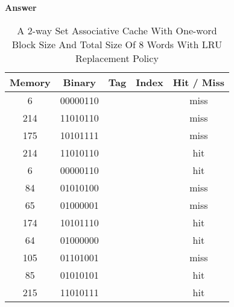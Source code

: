 \documentclass[10pt]{extarticle}
\begin{document}
\begin{enumerate}
\begin{enumerate}
            \textbf{Answer}
            \begin{table}[h]
                \centering
                \caption{A 2-way Set Associative Cache With One-word Block Size
                And Total Size Of 8 Words With LRU Replacement Policy}
                \begin{tabular*}{300pt}{@{\extracolsep{\fill}} ccccc}
                    \textbf{Memory} & \textbf{Binary} & \textbf{Tag} &
                    \textbf{Index} & \textbf{Hit / Miss} \\
                    \hline
                    6   & 00000110 & & & miss   \\
                    214 & 11010110 & & & miss   \\
                    175 & 10101111 & & & miss   \\
                    214 & 11010110 & & & hit    \\
                    6   & 00000110 & & & hit    \\
                    84  & 01010100 & & & miss   \\
                    65  & 01000001 & & & miss   \\
                    174 & 10101110 & & & hit    \\
                    64  & 01000000 & & & hit    \\
                    105 & 01101001 & & & miss   \\
                    85  & 01010101 & & & hit    \\
                    215 & 11010111 & & & hit    \\
                \end{tabular*}
            \end{table}
            \newpage

        \end{enumerate}

    \end{enumerate}
\end{document}
